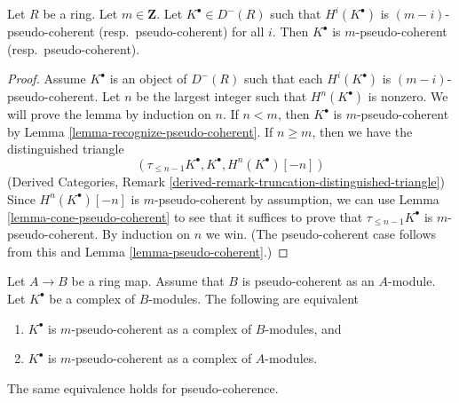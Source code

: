 \begin{lemma}
\label{lemma-cohomology-pseudo-coherent}
Let $R$ be a ring. Let $m \in \mathbf{Z}$.
Let $K^\bullet \in D^{-}(R)$ such that $H^i(K^\bullet)$ is
$(m - i)$-pseudo-coherent (resp.\ pseudo-coherent) for all $i$.
Then $K^\bullet$ is $m$-pseudo-coherent (resp.\ pseudo-coherent).
\end{lemma}

\begin{proof}
Assume $K^\bullet$ is an object of $D^{-}(R)$ such that
each $H^i(K^\bullet)$ is $(m - i)$-pseudo-coherent.
Let $n$ be the largest integer such that $H^n(K^\bullet)$ is nonzero.
We will prove the lemma by induction on $n$.
If $n < m$, then $K^\bullet$ is $m$-pseudo-coherent by
Lemma \ref{lemma-recognize-pseudo-coherent}.
If $n \geq m$, then we have the distinguished triangle
$$
(\tau_{\leq n - 1}K^\bullet, K^\bullet, H^n(K^\bullet)[-n])
$$
(Derived Categories, Remark
\ref{derived-remark-truncation-distinguished-triangle})
Since $H^n(K^\bullet)[-n]$ is $m$-pseudo-coherent by assumption, we
can use
Lemma \ref{lemma-cone-pseudo-coherent}
to see that it suffices to prove that $\tau_{\leq n - 1}K^\bullet$
is $m$-pseudo-coherent. By induction on $n$ we win. (The pseudo-coherent
case follows from this and
Lemma \ref{lemma-pseudo-coherent}.)
\end{proof}

\begin{lemma}
\label{lemma-finite-push-pseudo-coherent}
Let $A \to B$ be a ring map. Assume that $B$ is pseudo-coherent as an
$A$-module. Let $K^\bullet$ be a complex of $B$-modules.
The following are equivalent
\begin{enumerate}
\item $K^\bullet$ is $m$-pseudo-coherent
as a complex of $B$-modules, and
\item $K^\bullet$ is $m$-pseudo-coherent
as a complex of $A$-modules.
\end{enumerate}
The same equivalence holds for pseudo-coherence.
\end{lemma}

